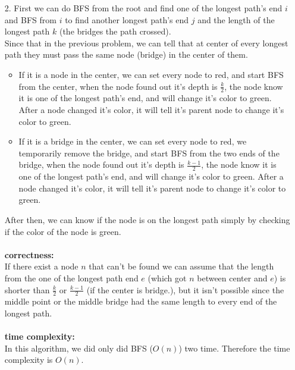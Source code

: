 \documentclass{homework}
\begin{document}
\begin{itemize}
    \item[2.] 
        First we can do BFS from the root and find one of the longest path's end $i$ and BFS from $i$ to find another longest path's end $j$ and the length of the longest path $k$ (the bridges the path crossed).\\
        Since that in the previous problem, we can tell that at center of every longest path they must pass the same node (bridge) in the center of them.\\
        \begin{itemize}
            \item If it is a node in the center, we can set every node to red, and start BFS from the center, when the node found out it's depth is $\frac{k}{2}$, the node know it is one of the longest path's end, and will change it's color to green. After a node changed it's color, it will tell it's parent node to change it's color to green.
            \item If it is a bridge in the center, we can set every node to red, we temporarily remove the bridge, and start BFS from the two ends of the bridge, when the node found out it's depth is $\frac{k-1}{2}$, the node know it is one of the longest path's end, and will change it's color to green. After a node changed it's color, it will tell it's parent node to change it's color to green.
        \end{itemize}
        After then, we can know if the node is on the longest path simply by checking if the color of the node is green.\\\\
        \textbf{correctness:}\\
        If there exist a node $n$ that can't be found we can assume that the length from the one of the longest path end $e$ (which got $n$ between center and $e$) is shorter than $\frac{k}{2}$ or $\frac{k-1}{2}$ (if the center is bridge.), but it isn't possible since the middle point or the middle bridge had the same length to every end of the longest path.\\\\
        \textbf{time complexity:}\\
        In this algorithm, we did only did BFS ($O(n)$) two time. Therefore the time complexity is $O(n)$.\\
\clearpage


\end{itemize}
\end{document}
